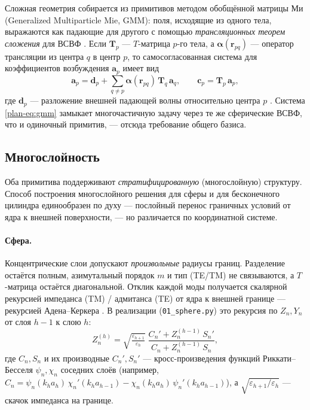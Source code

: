 \documentclass[11pt,a4paper]{article}
\begin{document}
Сложная геометрия собирается из примитивов методом обобщённой матрицы Ми (Generalized Multiparticle Mie, GMM): поля, исходящие из одного тела, выражаются как падающие для другого с помощью \emph{трансляционных теорем сложения} для ВСВФ \cite{stein1961,cruzan1962}. Если $\bm{T}_p$ --- $T$-матрица $p$-го тела, а $\bm{\alpha}(\bm{r}_{pq})$ --- оператор трансляции из центра $q$ в центр $p$, то самосогласованная система для коэффициентов возбуждения $\bm{a}_p$ имеет вид
\begin{equation}
\bm{a}_p=\bm{d}_p+\sum_{q\neq p}\bm{\alpha}(\bm{r}_{pq})\,\bm{T}_q\,\bm{a}_q,
\qquad
\bm{c}_p=\bm{T}_p\,\bm{a}_p,
\label{plan-eq:gmm}
\end{equation}
где $\bm{d}_p$ --- разложение внешней падающей волны относительно центра $p$ \cite{xu1995}. Система \eqref{plan-eq:gmm} замыкает многочастичную задачу через те же сферические ВСВФ, что и одиночный примитив, --- отсюда требование общего базиса.

\subsection{Многослойность}

Оба примитива поддерживают \emph{стратифицированную} (многослойную) структуру. Способ построения многослойного решения для сферы и для бесконечного цилиндра единообразен по духу --- послойный перенос граничных условий от ядра к внешней поверхности, --- но различается по координатной системе.

\paragraph{Сфера.} Концентрические слои допускают \emph{произвольные} радиусы границ. Разделение остаётся полным, азимутальный порядок $m$ и тип (TE/TM) не связываются, а $T$-матрица остаётся диагональной. Отклик каждой моды получается скалярной рекурсией импеданса (TM) / адмитанса (TE) от ядра к внешней границе --- рекурсией Адена--Керкера \cite{aden1951,bohren1983}. В реализации (\texttt{01\_sphere.py}) это рекурсия по $Z_n,Y_n$ от слоя $h-1$ к слою $h$:
\begin{equation}
Z_n^{(h)}=\sqrt{\tfrac{\varepsilon_{h+1}}{\varepsilon_h}}\;
\frac{C_n'+Z_n^{(h-1)}\,S_n'}{C_n+Z_n^{(h-1)}\,S_n},
\label{plan-eq:adenkerker}
\end{equation}
где $C_n,S_n$ и их производные $C_n',S_n'$ --- кросс-произведения функций Риккати--Бесселя $\psi_n,\chi_n$ соседних слоёв (например, $C_n=\psi_n(k_h a_h)\,\chi_n'(k_h a_{h-1})-\chi_n(k_h a_h)\,\psi_n'(k_h a_{h-1})$), а $\sqrt{\varepsilon_{h+1}/\varepsilon_h}$ --- скачок импеданса на границе.
\end{document}
